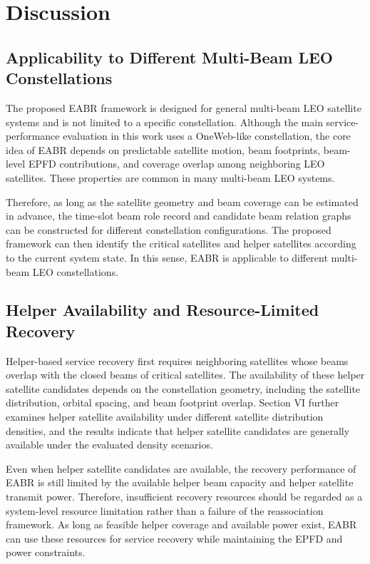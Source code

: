 
\section{Discussion}
\label{sec:chapter5}

\subsection{Applicability to Different Multi-Beam LEO Constellations}
\label{sec:discussion_applicability}

The proposed EABR framework is designed for general multi-beam LEO satellite systems and is not limited to a specific constellation. Although the main service-performance evaluation in this work uses a OneWeb-like constellation, the core idea of EABR depends on predictable satellite motion, beam footprints, beam-level EPFD contributions, and coverage overlap among neighboring LEO satellites. These properties are common in many multi-beam LEO systems.

Therefore, as long as the satellite geometry and beam coverage can be estimated in advance, the time-slot beam role record and candidate beam relation graphs can be constructed for different constellation configurations. The proposed framework can then identify the critical satellites and helper satellites according to the current system state. In this sense, EABR is applicable to different multi-beam LEO constellations.

\subsection{Helper Availability and Resource-Limited Recovery}
\label{sec:discussion_helper_resource}

Helper-based service recovery first requires neighboring satellites whose beams overlap with the closed beams of critical satellites. The availability of these helper satellite candidates depends on the constellation geometry, including the satellite distribution, orbital spacing, and beam footprint overlap. Section VI further examines helper satellite availability under different satellite distribution densities, and the results indicate that helper satellite candidates are generally available under the evaluated density scenarios.

Even when helper satellite candidates are available, the recovery performance of EABR is still limited by the available helper beam capacity and helper satellite transmit power. Therefore, insufficient recovery resources should be regarded as a system-level resource limitation rather than a failure of the reassociation framework. As long as feasible helper coverage and available power exist, EABR can use these resources for service recovery while maintaining the EPFD and power constraints.

